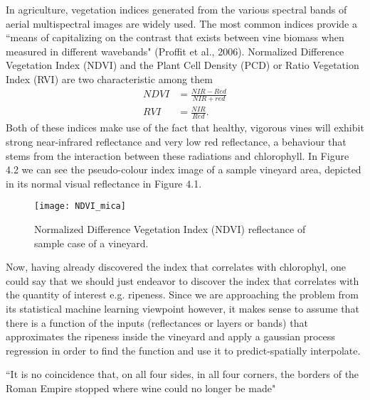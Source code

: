\documentclass[12pt,a4paper,oneside]{book}
\theoremstyle{plain}
\theoremstyle{definition}
\begin{document}
{\vspace{3mm}\noindent
In agriculture, vegetation indices generated from the various spectral bands of aerial multispectral images are widely used. The most common indices provide a ``means of capitalizing on the contrast that exists between vine biomass when measured in different wavebands" (Proffit et al., 2006). Normalized Difference Vegetation Index (NDVI) and the Plant Cell Density (PCD) or Ratio Vegetation Index (RVI) are two characteristic among them 
\begin{align*}
NDVI&=\frac{NIR-Red}{NIR+red}\\
RVI&=\frac{NIR}{Red}.
\end{align*} 
Both of these indices make use of the fact that healthy, vigorous vines will exhibit strong near-infrared reflectance and very low red reflectance, a behaviour that stems from the interaction between these radiations and chlorophyll. In Figure 4.2 we can see the pseudo-colour index image of a sample vineyard area, depicted in its normal visual reflectance in Figure 4.1. 

\begin{figure}[h]
\begin{center}
\texttt{[image: NDVI\_mica]}
\caption{Normalized Difference Vegetation Index (NDVI) reflectance of sample case of a vineyard.}
\end{center}
\end{figure}

\vspace{3mm}\noindent
Now, having already discovered the index that correlates with chlorophyl, one could say that we should just endeavor to discover the index that correlates with the quantity of interest e.g. ripeness. Since we are approaching the problem from its statistical machine learning viewpoint however, it makes sense to assume that there is a function of the inputs (reflectances or layers or bands) that approximates the ripeness inside the vineyard and apply a gaussian process regression in order to find the function and use it to predict-spatially interpolate. 


\begin{savequote}[45mm] 
``It is no coincidence that, on all four sides, in all four corners, the borders of the Roman Empire stopped where wine could no longer be made"
\end{savequote}
}
\end{document}
